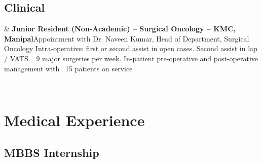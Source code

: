 \documentclass[10pt, letterpaper]{article}
\newcommand{\Year}[1]{\fontsize{9pt}{0}\selectfont #1}
\newcommand{\Twoline}[2]{\textbf{#1}\newline  #2}
\begin{document}
\subsection{Clinical}
\begin{EntriesTable}

  \Year{2021} &
  \Twoline{Junior Resident (Non-Academic) – Surgical Oncology – KMC, Manipal}
  {Appointment with Dr. Naveen Kumar, Head of Department, Surgical Oncology\newline
  Intra-operative: first or second assist in open cases. Second assist in lap / VATS. ~9 major surgeries per week.\newline
  In-patient pre-operative and post-operative management with ~15 patients on service\newline
  }
  \\
\end{EntriesTable}


\section{Medical Experience}
\subsection{MBBS Internship}
\end{document}
